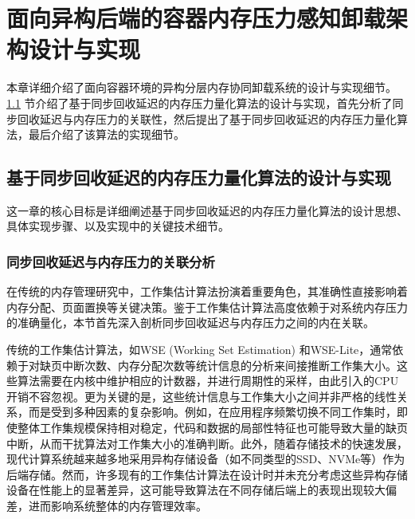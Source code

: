 \chapter{面向异构后端的容器内存压力感知卸载架构设计与实现}

本章详细介绍了面向容器环境的异构分层内存协同卸载系统的设计与实现细节。\ref{sec:基于同步回收延迟的内存压力量化算法的设计与实现} 节介绍了基于同步回收延迟的内存压力量化算法的设计与实现，首先分析了同步回收延迟与内存压力的关联性，然后提出了基于同步回收延迟的内存压力量化算法，最后介绍了该算法的实现细节。


\section{基于同步回收延迟的内存压力量化算法的设计与实现}
\label{sec:基于同步回收延迟的内存压力量化算法的设计与实现}
这一章的核心目标是详细阐述基于同步回收延迟的内存压力量化算法的设计思想、具体实现步骤、以及实现中的关键技术细节。

\subsection{同步回收延迟与内存压力的关联分析}

在传统的内存管理研究中，工作集估计算法扮演着重要角色，其准确性直接影响着内存分配、页面置换等关键决策。鉴于工作集估计算法高度依赖于对系统内存压力的准确量化，本节首先深入剖析同步回收延迟与内存压力之间的内在关联。

传统的工作集估计算法，如WSE (Working Set Estimation) 和WSE-Lite，通常依赖于对缺页中断次数、内存分配次数等统计信息的分析来间接推断工作集大小。这些算法需要在内核中维护相应的计数器，并进行周期性的采样，由此引入的CPU开销不容忽视。更为关键的是，这些统计信息与工作集大小之间并非严格的线性关系，而是受到多种因素的复杂影响。例如，在应用程序频繁切换不同工作集时，即使整体工作集规模保持相对稳定，代码和数据的局部性特征也可能导致大量的缺页中断，从而干扰算法对工作集大小的准确判断。此外，随着存储技术的快速发展，现代计算系统越来越多地采用异构存储设备（如不同类型的SSD、NVMe等）作为后端存储。然而，许多现有的工作集估计算法在设计时并未充分考虑这些异构存储设备在性能上的显著差异，这可能导致算法在不同存储后端上的表现出现较大偏差，进而影响系统整体的内存管理效率。


